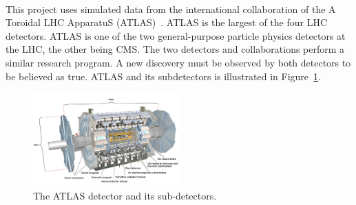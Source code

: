 \ \\This project uses simulated data from the international collaboration of the A Toroidal LHC ApparatuS (ATLAS)~\cite{ATLAS}. ATLAS is the largest of the four LHC detectors. ATLAS is one of the two general-purpose particle physics detectors at the LHC, the other being CMS. The two detectors and collaborations perform a similar research program. A new discovery must be observed by both detectors to be believed as true. ATLAS and its subdetectors is illustrated in Figure~\ref{fig:ATLAS}.

\begin{figure}[h]
  \centering
  \includegraphics[width=0.5\textwidth]{plots/ATLAS.jpg} 
  \caption{The ATLAS detector and its sub-detectors.}
  \label{fig:ATLAS}
\end{figure}
